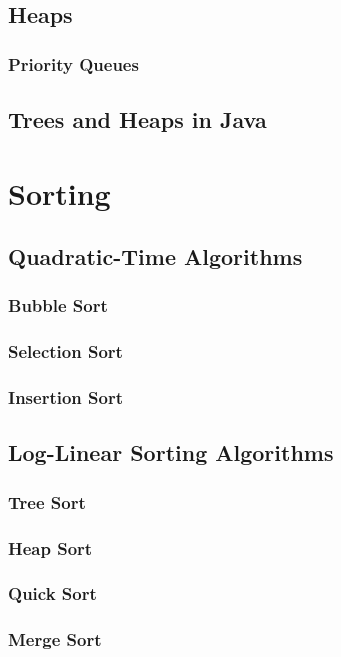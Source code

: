 \documentclass[10pt,a4paper]{book}
\begin{document}
\section{Heaps}


\subsection{Priority Queues}

\section{Trees and Heaps in Java}
\chapter{Sorting}


\section{Quadratic-Time Algorithms}

\subsection{Bubble Sort}

\subsection{Selection Sort}

\subsection{Insertion Sort}


\section{Log-Linear Sorting Algorithms}

\subsection{Tree Sort}
\subsection{Heap Sort}
\subsection{Quick Sort}
\subsection{Merge Sort}
\end{document}
